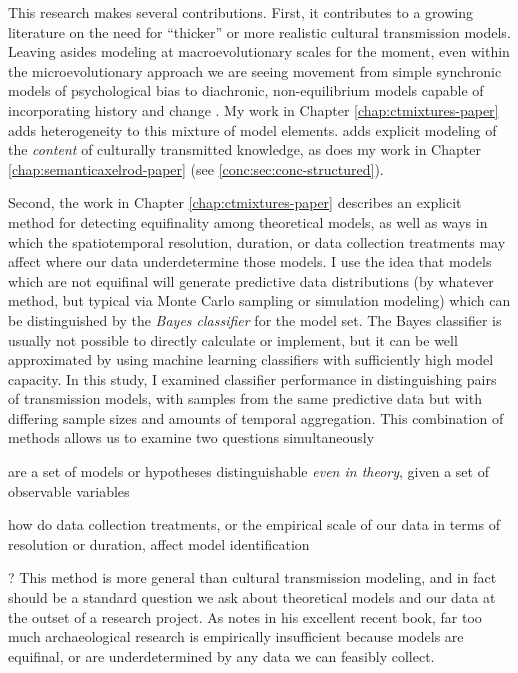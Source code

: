 This research makes several contributions.  First, it contributes to a growing literature on the need for ``thicker'' or more realistic cultural transmission models.  Leaving asides modeling at macroevolutionary scales for the moment, even within the microevolutionary approach we are seeing movement from simple synchronic models of psychological bias to diachronic, non-equilibrium models capable of incorporating history and change .  My work in Chapter \ref{chap:ctmixtures-paper} adds heterogeneity to this mixture of model elements.  \citet{Tostevin2012,tostevin2019content} adds explicit modeling of the \emph{content} of culturally transmitted knowledge, as does my work in Chapter \ref{chap:semanticaxelrod-paper} (see \ref{conc:sec:conc-structured}). 

Second, the work in Chapter \ref{chap:ctmixtures-paper} describes an explicit method for detecting equifinality among theoretical models, as well as ways in which the spatiotemporal resolution, duration, or data collection treatments may affect where our data underdetermine those models.  I use the idea that models which are not equifinal will generate predictive data distributions (by whatever method, but typical via Monte Carlo sampling or simulation modeling) which can be distinguished by the \emph{Bayes classifier} for the model set.  The Bayes classifier is usually not possible to directly calculate or implement, but it can be well approximated by using machine learning classifiers with sufficiently high model capacity.  In this study, I examined classifier performance in distinguishing pairs of transmission models, with samples from the same predictive data but with differing sample sizes and amounts of temporal aggregation.  This combination of methods allows us to examine two questions simultaneously \begin{dissparalist}
\item are a set of models or hypotheses distinguishable \emph{even in theory}, given a set of observable variables
\item how do data collection treatments, or the empirical scale of our data in terms of resolution or duration, affect model identification
\end{dissparalist}?  This method is more general than cultural transmission modeling, and in fact should be a standard question we ask about theoretical models and our data at the outset of a research project.  As \citet{perreault2019quality} notes in his excellent recent book, far too much archaeological research is empirically insufficient because models are equifinal, or are underdetermined by any data we can feasibly collect.  

